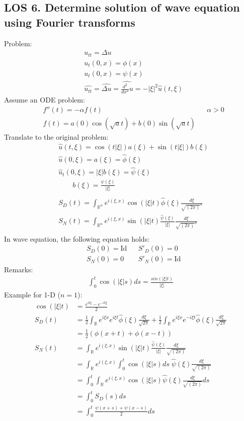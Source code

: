 \documentclass[12pt, a4paper]{article}
\begin{document}
\subsection*{LOS 6. Determine solution of wave equation using Fourier transforms}
Problem:
\begin{align*}
    &u_{tt} = \Delta u\\
    &u_t(0, x) = \phi(x)\\
    &u_t(0, x) = \psi(x)\\
    &\widehat{u_{tt}} = \widehat{\Delta u} = \widehat{\frac{d^2}{dx^2}u} = -|\xi|^2\hat{u}(t, \xi)
\end{align*}
Assume an ODE problem:
\begin{align*}
    &f''(t) = -\alpha f(t) && \alpha > 0\\
    &f(t) = a(0)\cos(\sqrt{a}t) + b(0)\sin(\sqrt{a}t)
\end{align*}
Translate to the original problem:
\begin{align*}
    &\hat{u}(t, \xi) = \cos(t|\xi|)a(\xi) + \sin(t|\xi|)b(\xi)\\
    &\hat{u}(0, \xi) = a(\xi) = \hat{\phi}(\xi)\\
    &\hat{u}_t(0, \xi) = |\xi|b(\xi) = \hat{\psi}(\xi)\\
    &\qquad b(\xi) = \frac{\psi(\xi)}{|\xi|}\\\\
    &S_D(t) = \int_{\mathbb{R}^n}e^{i(\xi, x)}\cos(|\xi|t)\hat{\phi}(\xi)\frac{d\xi}{\sqrt{(2\pi)}^n}\\
    &S_N(t) = \int_{\mathbb{R}^n}e^{i(\xi, x)}\sin(|\xi|t)\frac{\hat{\psi}(\xi)}{|\xi|}\frac{d\xi}{\sqrt{(2\pi)}^n}\\
\end{align*}
In wave equation, the following equation holds:
\begin{align*}
    &S_D(0) = \text{Id} && S'_D(0) = 0\\
    &S_N(0) = 0 && S'_N(0)=\text{Id}
\end{align*}
Remarks:
\begin{align*}
    \int_0^t \cos(|\xi|s)ds = \frac{sin(|\xi|t)}{|\xi|}
\end{align*}
Example for 1-D ($n=1$):
\begin{align*}
    \cos(|\xi|t) &= \frac{e^{it\xi} - e^{-it\xi}}{2}\\
    S_D(t) &= \frac{1}{2}\int_{\mathbb{R}}e^{i\xi x}e^{i\xi t}\hat{\phi}(\xi)\frac{d\xi}{\sqrt{2\pi}}+\frac{1}{2}\int_{\mathbb{R}}e^{i\xi x}e^{-i\xi t}\hat{\phi}(\xi)\frac{d\xi}{\sqrt{2\pi}}\\
    &=\frac{1}{2}\left(\phi(x+t)+\phi(x-t)\right)\\
    S_N(t) &= \int_{\mathbb{R}}e^{i(\xi, x)}\sin(|\xi|t)\frac{\hat{\psi}(\xi)}{|\xi|}\frac{d\xi}{\sqrt{(2\pi)}}\\
    &=\int_{\mathbb{R}}e^{i(\xi, x)}\int_0^t \cos(|\xi|s)ds\;\hat{\psi}(\xi)\frac{d\xi}{\sqrt{(2\pi)}}\\
    &=\int_0^t\int_{\mathbb{R}}e^{i(\xi, x)} \cos(|\xi|s)\hat{\psi}(\xi)\frac{d\xi}{\sqrt{(2\pi)}}ds\\
    &=\int_0^tS_D(s)ds\\
    &=\int_0^t\frac{\psi(x+s)+\psi(x-s)}{2}ds
\end{align*}
\end{document}

